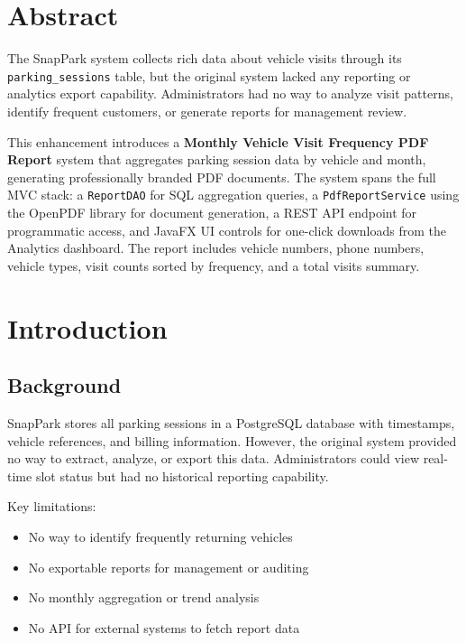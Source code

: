 \documentclass[12pt,a4paper]{article}
\begin{document}
\newpage
\section*{Abstract}

The SnapPark system collects rich data about vehicle visits through its \texttt{parking\_sessions} table, but the original system lacked any reporting or analytics export capability. Administrators had no way to analyze visit patterns, identify frequent customers, or generate reports for management review.

This enhancement introduces a \textbf{Monthly Vehicle Visit Frequency PDF Report} system that aggregates parking session data by vehicle and month, generating professionally branded PDF documents. The system spans the full MVC stack: a \texttt{ReportDAO} for SQL aggregation queries, a \texttt{PdfReportService} using the OpenPDF library for document generation, a REST API endpoint for programmatic access, and JavaFX UI controls for one-click downloads from the Analytics dashboard. The report includes vehicle numbers, phone numbers, vehicle types, visit counts sorted by frequency, and a total visits summary.

\newpage
\tableofcontents
\newpage

\section{Introduction}

\subsection{Background}
SnapPark stores all parking sessions in a PostgreSQL database with timestamps, vehicle references, and billing information. However, the original system provided no way to extract, analyze, or export this data. Administrators could view real-time slot status but had no historical reporting capability.

Key limitations:
\begin{itemize}[noitemsep]
    \item No way to identify frequently returning vehicles
    \item No exportable reports for management or auditing
    \item No monthly aggregation or trend analysis
    \item No API for external systems to fetch report data
\end{itemize}
\end{document}
